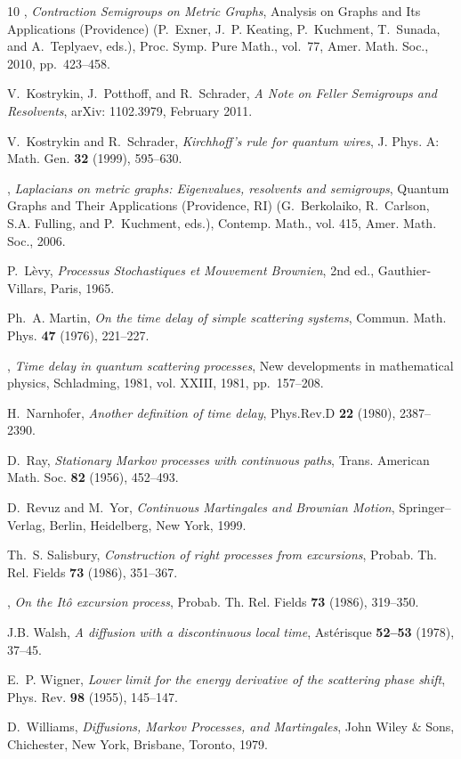 \documentclass[11pt,a4paper]{amsart}
\newcommand{\1}{1}
\theoremstyle{remark}
\numberwithin{equation}{section}
\begin{document}
\begin{thebibliography}{10}
\bysame, \emph{{C}ontraction {S}emigroups on {M}etric {G}raphs}, Analysis on
  Graphs and Its Applications (Providence) (P.~Exner, J.~P. Keating,
  P.~Kuchment, T.~Sunada, and A.~Teplyaev, eds.), Proc. Symp. Pure Math.,
  vol.~77, Amer. Math. Soc., 2010, pp.~423--458.

V.~Kostrykin, J.~Potthoff, and R.~Schrader, \emph{{A} {N}ote on {F}eller
  {S}emigroups and {R}esolvents}, arXiv: 1102.3979, February 2011.

V.~Kostrykin and R.~Schrader, \emph{{K}irchhoff's rule for quantum wires}, J.
  Phys. A: Math. Gen. \textbf{32} (1999), 595--630.

\bysame, \emph{{L}aplacians on metric graphs: {E}igenvalues, resolvents and
  semigroups}, Quantum Graphs and Their Applications (Providence, RI)
  (G.~Berkolaiko, R.~Carlson, S.A. Fulling, and P.~Kuchment, eds.), Contemp.
  Math., vol. 415, Amer. Math. Soc., 2006.

P.~L\`evy, \emph{{P}rocessus {S}tochastiques et {M}ouvement {B}rownien}, 2nd
  ed., Gauthier-Villars, Paris, 1965.

Ph.~A. Martin, \emph{{O}n the time delay of simple scattering systems}, Commun.
  Math. Phys. \textbf{47} (1976), 221--227.

\bysame, \emph{{T}ime delay in quantum scattering processes}, New developments
  in mathematical physics, Schladming, 1981, vol. XXIII, 1981, pp.~157--208.

H.~Narnhofer, \emph{{A}nother definition of time delay}, Phys.Rev.D \textbf{22}
  (1980), 2387--2390.

D.~Ray, \emph{{S}tationary {M}arkov processes with continuous paths}, Trans.
  American Math. Soc. \textbf{82} (1956), 452--493.

D.~Revuz and M.~Yor, \emph{{C}ontinuous {M}artingales and {B}rownian {M}otion},
  Springer--Verlag, Berlin, Heidelberg, New York, 1999.

Th.~S. Salisbury, \emph{{C}onstruction of right processes from excursions},
  Probab. Th. Rel. Fields \textbf{73} (1986), 351--367.

\bysame, \emph{{O}n the {I}t{\^o} excursion process}, Probab. Th. Rel. Fields
  \textbf{73} (1986), 319--350.

{J.B.} Walsh, \emph{{A} diffusion with a discontinuous local time},
  Ast\'erisque \textbf{52--53} (1978), 37--45.

E.~P. Wigner, \emph{{L}ower limit for the energy derivative of the scattering
  phase shift}, Phys. Rev. \textbf{98} (1955), 145--147.

D.~Williams, \emph{{D}iffusions, {M}arkov {P}rocesses, and {M}artingales}, John
  Wiley {\&} Sons, Chichester, New York, Brisbane, Toronto, 1979.

\end{thebibliography}
\end{document}
